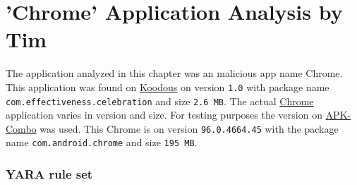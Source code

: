 \section{'Chrome' Application Analysis by Tim}

The application analyzed in this chapter was an malicious app name Chrome.
This application was found on \href{https://koodous.com/apks/ef613e042afafb955baedc75033f6ff73d19a795ae7f541981dfe624bc700887}{Koodous} 
on version \texttt{1.0} with package name \texttt{com.effectiveness.celebration} and size \texttt{2.6 MB}.
The actual \href{https://play.google.com/store/apps/details?id=com.android.chrome&hl=en&gl=US}{Chrome} application varies in version and size. 
For testing purposes the version on \href{https://apkcombo.com/nl/chrome/com.android.chrome/}{APK-Combo} was used.
This Chrome is on version \texttt{96.0.4664.45} with the package name \texttt{com.android.chrome} and size \texttt{195 MB}.
















\newpage
\subsubsection{YARA rule set}


